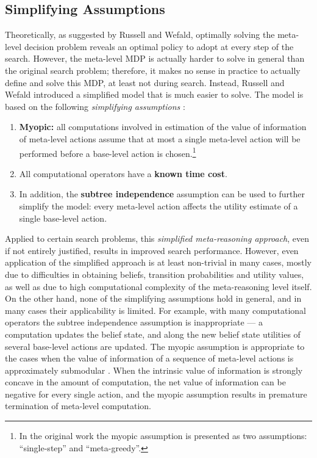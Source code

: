 \subsection{Simplifying Assumptions}
\label{sec:ratimeta-assumptions}

Theoretically, as suggested by Russell and Wefald, optimally solving
the meta-level decision problem reveals an optimal policy to adopt at
every step of the search. However, the meta-level MDP is actually
harder to solve in general than the original search problem;
therefore, it makes no sense in practice to actually define and solve 
this MDP, at least not during search. Instead, Russell and Wefald
introduced a simplified model that is much easier to solve. The model
is based on the following \emph{simplifying
assumptions} \cite{Russell.right}: 
\begin{enumerate}
\item \textbf{Myopic:} all computations involved in estimation of the
value of information of meta-level actions assume that at most a single
meta-level action will be performed before a base-level action is
chosen.\footnote{In the original work \cite{Russell.right} the myopic
assumption is presented as two assumptions: ``single-step'' and
``meta-greedy''.}
\item All computational operators have a \textbf{known time cost}.
\item In addition, the \textbf{subtree independence} assumption can
be used to further simplify the model: every meta-level action
affects the utility estimate of a single base-level action. 
\end{enumerate}
Applied to certain search problems, this \emph{simplified
meta-reasoning approach}, even if not entirely justified, results in
improved search performance. However, even application of the
simplified approach is at least non-trivial in many cases, mostly due
to difficulties in obtaining beliefs, transition probabilities and
utility values, as well as due to high computational complexity of the
meta-reasoning level itself. On the other hand, none of the simplifying
assumptions hold in general, and in many cases their applicability is
limited. For example, with many computational operators the subtree
independence assumption is inappropriate --- a computation updates
the belief state, and along the new belief state utilities of several
base-level actions are updated. The myopic assumption is appropriate to
the cases when the value of information of a sequence of meta-level
actions is approximately submodular \cite{Guestrin.submodular}. When 
the intrinsic value of information is strongly concave in the amount of
computation, the net value of information can be negative for every
single action, and the myopic assumption results in premature
termination of meta-level computation. 
